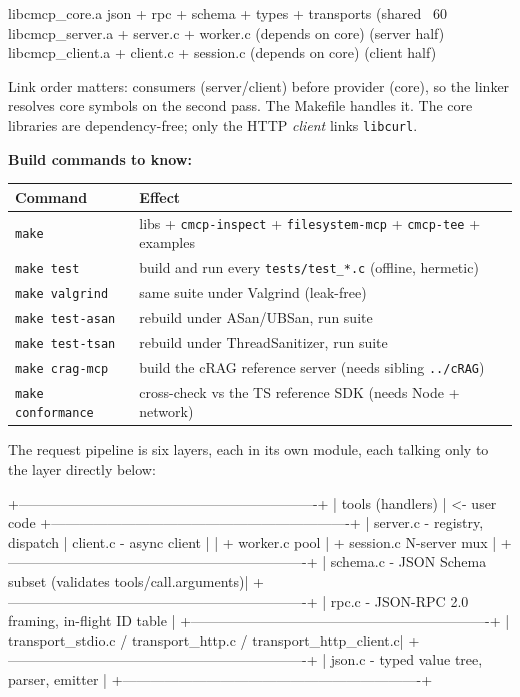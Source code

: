 \documentclass[10pt]{article}
\newcommand{\code}[1]{\texttt{\small #1}}
\begin{document}
\begin{diag}
  libcmcp_core.a    json + rpc + schema + types + transports        (shared ~60%
  libcmcp_server.a  + server.c + worker.c        (depends on core)   (server half)
  libcmcp_client.a  + client.c + session.c       (depends on core)   (client half)
\end{diag}

Link order matters: consumers (server/client) before provider (core), so the
linker resolves core symbols on the second pass. The Makefile handles it. The
core libraries are dependency-free; only the HTTP \emph{client} links
\code{libcurl}.

\textbf{Build commands to know:}
\begin{center}\small
\begin{tabular}{l l}
\toprule
Command & Effect \\
\midrule
\code{make}            & libs + \code{cmcp-inspect} + \code{filesystem-mcp} + \code{cmcp-tee} + examples \\
\code{make test}       & build and run every \code{tests/test\_*.c} (offline, hermetic) \\
\code{make valgrind}   & same suite under Valgrind (leak-free) \\
\code{make test-asan}  & rebuild under ASan/UBSan, run suite \\
\code{make test-tsan}  & rebuild under ThreadSanitizer, run suite \\
\code{make crag-mcp}   & build the cRAG reference server (needs sibling \code{../cRAG}) \\
\code{make conformance}& cross-check vs the TS reference SDK (needs Node + network) \\
\bottomrule
\end{tabular}
\end{center}

The request pipeline is six layers, each in its own module, each talking only to
the layer directly below:

\begin{diag}
  +----------------------------------------------------------------+
  |                      tools (handlers)                          |  <- user code
  +----------------------------------------------------------------+
  |  server.c - registry, dispatch    |  client.c - async client   |
  |   + worker.c pool                 |   + session.c N-server mux  |
  +----------------------------------------------------------------+
  |  schema.c - JSON Schema subset (validates tools/call.arguments)|
  +----------------------------------------------------------------+
  |  rpc.c - JSON-RPC 2.0 framing, in-flight ID table              |
  +----------------------------------------------------------------+
  |  transport_stdio.c / transport_http.c / transport_http_client.c|
  +----------------------------------------------------------------+
  |  json.c - typed value tree, parser, emitter                    |
  +----------------------------------------------------------------+
\end{diag}
\end{document}

